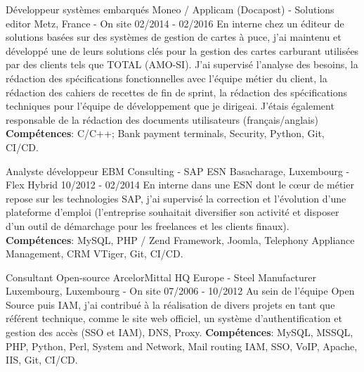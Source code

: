 \begin{cventries}
  \cventry
    {Développeur systèmes embarqués} %
    {Moneo / Applicam (Docapost) - Solutions editor} %
    {Metz, France - On site} %
    {02/2014 - 02/2016} %
    {
      En interne chez un éditeur de solutions basées sur des systèmes de gestion de 
      cartes à puce, j'ai maintenu et développé une de leurs solutions clés pour la 
      gestion des cartes carburant utilisées par des clients tels que TOTAL (AMO-SI).
      \newline
      J'ai supervisé l'analyse des besoins, la rédaction des spécifications 
      fonctionnelles avec l'équipe métier du client, la rédaction des cahiers de 
      recettes de fin de sprint, la rédaction des spécifications techniques pour 
      l'équipe de développement que je dirigeai.
      \newline
      J'étais également responsable de la rédaction des documents utilisateurs (français/anglais)
      \newline
      \textbf{Compétences}: C/C++; Bank payment terminals, Security, Python, Git, CI/CD.
    }

  \cventry
    {Analyste développeur} %
    {EBM Consulting - SAP ESN} %
    {Basacharage, Luxembourg - Flex Hybrid} %
    {10/2012 - 02/2014} %
    {
      En interne dans une ESN dont le cœur de métier repose sur les technologies SAP, j'ai 
      supervisé la correction et l'évolution d'une plateforme d'emploi (l'entreprise 
      souhaitait diversifier son activité et disposer d'un outil de démarchage pour 
      les freelances et les clients finaux).
      \newline
      \textbf{Compétences}: MySQL, PHP / Zend Framework, Joomla, Telephony Appliance Management, CRM VTiger, Git, CI/CD.
    }

  \cventry
    {Consultant Open-source} %
    {ArcelorMittal HQ Europe - Steel Manufacturer} %
    {Luxembourg, Luxembourg - On site} %
    {07/2006 - 10/2012} %
    {
      Au sein de l'équipe Open Source puis IAM, j'ai contribué à la réalisation de 
      divers projets en tant que référent technique, comme le site web officiel, 
      un système d'authentification et gestion des accès (SSO et IAM), DNS, Proxy.
      \newline
      \textbf{Compétences}: MySQL, MSSQL, PHP, Python, Perl, System and Network, Mail routing IAM, SSO, VoIP, Apache, IIS, Git, CI/CD.
    }


\end{cventries}
